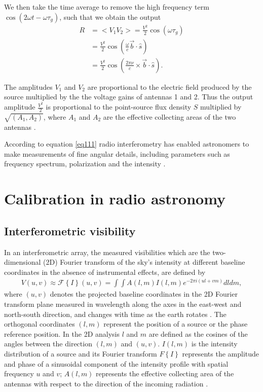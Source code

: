 We then take the time average to remove the high frequency term $\cos(2\omega t - \omega \tau_{g})$, such that we obtain the output 
\begin{align}
R&= <V_1V_2> = \frac{V^2}{2}  \cos (\omega\tau_{g})\\
  &= \frac{V^2}{2}  \cos \left( \frac{\omega}{c} \overrightarrow{b} \cdot \widehat{s} \right)\\
   &= \frac{V^2}{2}  \cos \left( \frac{2\pi \nu}{c} \times
   \overrightarrow{b} \cdot \widehat{s} \right). 
\end{align}

The amplitudes $V_1$ and $V_2$ are proportional to the electric field produced by the  source multiplied by the the voltage gains of antennas 1 and 2. Thus the output amplitude $\frac{V^2}{2}$ is proportional to the point-source flux density $S$ multiplied by $\sqrt{(A_1, A_2)}$, where $A_1$ and $A_2$ are the effective collecting areas of the two antennas \citep{NRAO}.

According to equation \ref{eq111} 
radio interferometry has enabled astronomers to make measurements of fine angular  details, including parameters such as frequency spectrum, polarization and the intensity \citep{thompson2001interferometry}.

\section{Calibration in radio astronomy}
\label{Calibr}
\subsection{Interferometric visibility}
In an interferometric array, the measured visibilities  which are the two-dimensional (2D) Fourier transform of the sky's intensity at different baseline coordinates in the absence of instrumental effects, are defined by
\begin{align}
V(u,v)\approx \mathcal{F}\left\{I\right\}(u,v)=\int \int A(l,m) I (l,m)e^{-2\pi i(ul+vm)} dl dm,
\label{Vis}
\end{align}
where $(u,v)$ denotes the projected baseline coordinates in the 2D Fourier transform plane  measured in wavelength along the axes in the east-west and north-south direction, and changes with time as the earth rotates  \citep{taylor1999synthesis}. The orthogonal coordinates $(l, m)$ represent the position of a source or the phase reference position. In the 2D analysis $l$ and $m$ are defined as the cosines of the  angles between the direction $(l,m)$ and $(u, v)$. $I(l,m)$ is the intensity distribution of a source and its Fourier transform  ${F}\left\{I\right\}$ represents the amplitude and phase of a sinusoidal component of the intensity profile with spatial frequency $u$ and $v$; $A(l, m)$ represents the effective collecting area of the antennas with respect to the direction of the incoming radiation \citep{thompson2001interferometry}.

